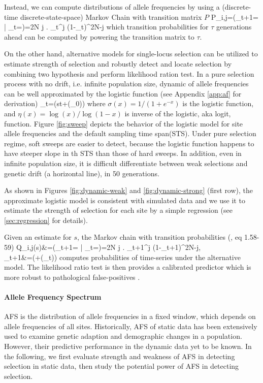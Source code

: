 \documentclass[11pt]{article}
\begin{document}
Instead, we can compute distributions of allele frequencies by using a 
(discrete-time discrete-state-space) Markov Chain with transition matrix $P$
\beq
P_{i,j}=\pr\left(\nu_{t+1}= \left| 
\nu_{t}=\right)={2N 
	\choose j} \right. 
\nu_{t}^j (1-\nu_{t})^{2N-j} 
\eeq
which transition probabilities for $\tau$ generations ahead can be computed by 
powering the transition matrix to $\tau$.

On the other hand, alternative models for single-locus selection can be 
utilized to estimate strength of selection and robustly detect and locate 
selection by 
combining two hypothesis and perform likelihood ration test.
In a pure selection process with no drift, i.e. infinite population size, 
dynamic of allele frequencies 
can be well approximated by the logistic function (see Appendix \ref{app:af} 
for 
derivation)
\beq
\nu_t=\sigma(st+\eta(\nu_0))\label{eq:nut}
\eeq
where $\sigma(x)=1/(1+e^{-x})$ is the logistic function, and 
$\eta(x)=\log(x)/\log(1-x)$ is inverse of the 
logistic, aka logit, function. Figure \ref{fig:sweep} depicts the behavior of 
the logistic model for site allele frequencies and the default sampling time 
span(STS). Under pure selection regime, soft sweeps are easier to detect, 
because the logistic function happens to have steeper slope in th STS than 
those of hard sweeps. In addition, even in infinite population size, it is 
difficult differentiate between weak selections and genetic drift (a horizontal 
line), in 50 generations.


As shown in Figures \ref{fig:dynamic-weak} and \ref{fig:dynamic-strong} (first 
row), the approximate logistic model is consistent with simulated data and we 
use it to estimate the strength of selection for 
each site by a simple regression (see \ref{sec:regression} for details).

Given an estimate for $s$, the Markov chain with transition probabilities 
(\cite{Ewens2012Mathematical}, eq 1.58-59)
\beq
Q_{i,j}(s)&=\pr\left(\nu_{t+1}= \left| 
\nu_{t}=\right)={2N 
	\choose j} \right. 
\hat{\nu}_{t+1}^{j} (1-\hat{\nu}_{t+1})^{2N-j},\\
\hat{\nu}_{t+1}&=\sigma(+\eta(\nu_t))
\eeq
computes probabilities of time-series under the alternative model. The 
likelihood ratio test is then provides a calibrated predictor which is more 
robust to pathological false-positives \cite{feder2014Identifying}.



\paragraph{Allele Frequency Spectrum} AFS is the distribution of allele 
frequencies in a fixed window, which depends on allele frequencies of all sites.
Historically, AFS of static data has been extensively used to examine genetic 
adaption and demographic changes in a population. However, their predictive 
performance in the dynamic data yet to be known. In the following, we first 
evaluate strength and weakness of AFS in detecting selection in static data, 
then study the potential power of AFS in detecting selection.
\end{document}
